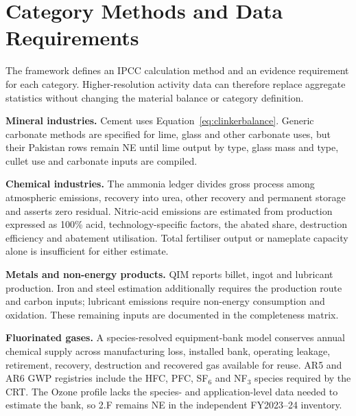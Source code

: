 \section{Category Methods and Data Requirements}
\label{sec:factors}

The framework defines an IPCC calculation method and an evidence requirement for each
category. Higher-resolution activity data can therefore replace aggregate statistics without
changing the material balance or category definition.

\textbf{Mineral industries.} Cement uses Equation~\ref{eq:clinkerbalance}. Generic carbonate
methods are specified for lime, glass and other carbonate uses, but their Pakistan rows remain
NE until lime output by type, glass mass and type, cullet use and carbonate inputs are compiled.

\textbf{Chemical industries.} The ammonia ledger divides gross process \COtwo{} among
atmospheric emissions, recovery into urea, other recovery and permanent storage and asserts
zero residual. Nitric-acid emissions are estimated from production expressed as 100\% acid,
technology-specific
\NtwoO{} factors, the abated share, destruction efficiency and abatement utilisation. Total
fertiliser output or nameplate capacity alone is insufficient for either estimate.

\textbf{Metals and non-energy products.} QIM reports billet, ingot and lubricant production.
Iron and steel estimation additionally requires the production route and carbon inputs;
lubricant emissions require non-energy consumption and oxidation. These remaining inputs are
documented in the completeness matrix.

\textbf{Fluorinated gases.} A species-resolved equipment-bank model conserves annual chemical
supply across manufacturing loss, installed bank, operating leakage, retirement, recovery,
destruction and recovered gas available for reuse. AR5 and AR6 GWP registries include the HFC,
PFC, SF$_6$ and NF$_3$ species required by the CRT. The Ozone profile lacks the species- and
application-level data needed to estimate the bank, so 2.F remains NE in the independent
FY2023--24 inventory.
